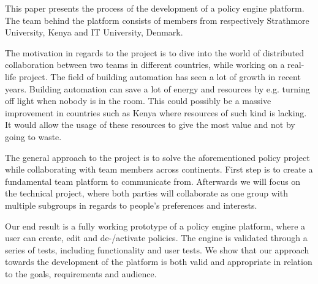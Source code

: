 This paper presents the process of the development of a policy engine platform. The team behind the platform consists of members from respectively Strathmore University, Kenya and IT University, Denmark. 

The motivation in regards to the project is to dive into the world of distributed collaboration between two teams in different countries, while working on a real-life project. The field of building automation has seen a lot of growth in recent years. Building automation can save a lot of energy and resources by e.g. turning off light when nobody is in the room. This could possibly be a massive improvement in countries such as Kenya where resources of such kind is lacking. It would allow the usage of these resources to give the most value and not by going to waste.

The general approach to the project is to solve the aforementioned policy project while collaborating with team members across continents. First step is to create a fundamental team platform to communicate from. Afterwards we will focus on the technical project, where both parties will collaborate as one group with multiple subgroups in regards to people's preferences and interests.

Our end result is a fully working prototype of a policy engine platform, where a user can create, edit and de-/activate policies. The engine is validated through a series of tests, including functionality and user tests. We show that our approach towards the development of the platform is both valid and appropriate in relation to the goals, requirements and audience.